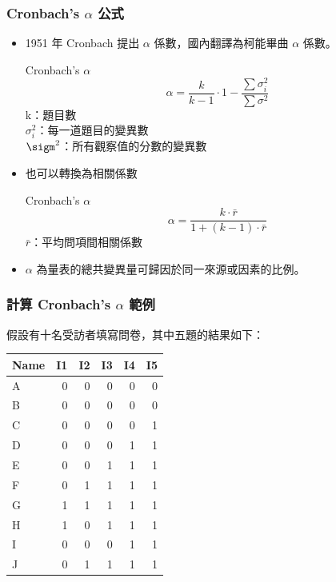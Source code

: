 \documentclass[xcolor=dvipsnames, 13pt]{beamer}
\begin{document}
\begin{frame}\frametitle{Cronbach's $\alpha$ 公式}
\begin{itemize}
\item 1951 年 Cronbach 提出 $\alpha$ 係數，國內翻譯為柯能畢曲 $\alpha$ 係數。
\begin{block}{Cronbach's $\alpha$}
\[\alpha=\frac{k}{k-1}\cdot{1-\frac{\sum \sigma^2_{i}}{\sum \sigma^2}} \]
k：題目數 \\
$\sigma^2_{i}$：每一道題目的變異數\\
$\sigm^2$：所有觀察值的分數的變異數
\end{block}
\item 也可以轉換為相關係數
\begin{block}{Cronbach's $\alpha$}
\[\alpha=\frac{k\cdot{\bar{r}}}{1+(k-1)\cdot{\bar{r}}} \]
$\bar{r}$：平均問項間相關係數
\end{block}
\item $\alpha$ 為量表的總共變異量可歸因於同一來源或因素的比例。
\end{itemize}
\end{frame}


\begin{frame}\frametitle{計算 Cronbach's $\alpha$ 範例}
假設有十名受訪者填寫問卷，其中五題的結果如下：
\begin{table}
\begin{tabular}{l | r  r  r  r  r }
\hline
Name & I1 & I2 & I3 & I4 & I5 \\
\hline
A & 0 & 0 & 0 & 0 & 0 \\
B & 0 & 0 & 0 & 0 & 0 \\
C & 0 & 0 & 0 & 0 & 1 \\
D & 0 & 0 & 0 & 1 & 1 \\
E & 0 & 0 & 1 & 1 & 1 \\
F & 0 & 1 & 1 & 1 & 1 \\
G & 1 & 1 & 1 & 1 & 1 \\
H & 1 & 0 & 1 & 1 & 1 \\
I & 0 & 0 & 0 & 1 & 1 \\
J & 0 & 1 & 1 & 1 & 1 \\
\hline
\end{tabular}
\end{table}
\end{frame}
\end{document}

